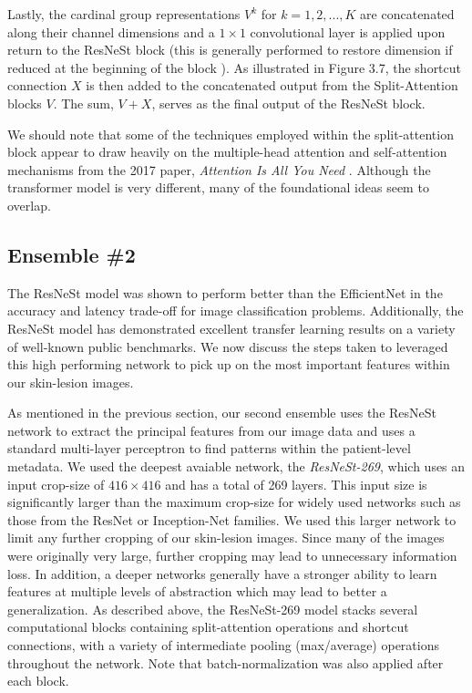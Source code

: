 \documentclass [MAS] {uclathes}
\begin{document}
Lastly, the cardinal group representations $V^k$ for $k=1, 2, ..., K$ are concatenated along their channel dimensions and a $1 \times 1$ convolutional layer is applied upon return to the ResNeSt block (this is generally performed to restore dimension if reduced at the beginning of the block \cite{resnet}). As illustrated in Figure 3.7, the shortcut connection $X$ is then added to the concatenated output from the Split-Attention blocks $V$. The sum, $V+X$, serves as the final output of the ResNeSt block.

We should note that some of the techniques employed within the split-attention block appear to draw heavily on the multiple-head attention and self-attention mechanisms from the 2017 paper, \textit{Attention Is All You Need} \cite{attention}. Although the transformer model is very different, many of the foundational ideas seem to overlap.

\subsection{Ensemble \#2}

The ResNeSt model was shown to perform better than the EfficientNet in the accuracy and latency trade-off for image classification problems. Additionally, the ResNeSt model has demonstrated excellent transfer learning results on a variety of well-known public benchmarks. We now discuss the steps taken to leveraged this high performing network to pick up on the most important features within our skin-lesion images.

As mentioned in the previous section, our second ensemble uses the ResNeSt network to extract the principal features from our image data and uses a standard multi-layer perceptron to find patterns within the patient-level metadata. We used the deepest avaiable network, the \textit{ResNeSt-269}, which uses an input crop-size of $416 \times 416$ and has a total of 269 layers. This input size is significantly larger than the maximum crop-size for widely used networks such as those from the ResNet or Inception-Net families. We used this larger network to limit any further cropping of our skin-lesion images. Since many of the images were originally very large, further cropping may lead to unnecessary information loss. In addition, a deeper networks generally have a stronger ability to learn features at multiple levels of abstraction which may lead to better a generalization. As described above, the ResNeSt-269 model stacks several computational blocks containing split-attention operations and shortcut connections, with a variety of intermediate pooling (max/average) operations throughout the network. Note that batch-normalization was also applied after each block.
\end{document}
